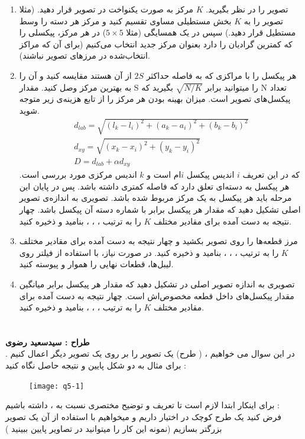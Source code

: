 \documentclass[a4paper]{article}
\begin{document}
\begin{enumerate}
	\item 
	تصویر 
	را در نظر بگیرید. 
$ K $
مرکز به صورت  یکنواخت در تصویر قرار دهید. (مثلا تصویر را به $ K $ بخش مستطیلی مساوی تقسیم کنید و مرکز هر دسته را وسط مستطیل قرار دهید.)  سپس در یک همسایگی (مثلا $ 5 \times 5 $) در هر مرکز، پیکسلی را که کمترین گرادیان را دارد بعنوان مرکز جدید انتخاب می‌کنیم (برای آن که مراکز انتخاب‌شده در مرزهای تصویر نباشند). 
\item
هر پیکسل را با مراکزی که به فاصله حداکثر 
$ 2S $ 
از آن هستند مقایسه کنید و آن‌ را به بهترین مرکز وصل کنید. مقدار S را میتوانید برابر 
$ \sqrt{N/K} $
بگیرید که N تعداد پیکسل‌های تصویر است. میزان بهینه بودن هر مرکز را از تابع هزینه‌ی زیر متوجه شوید. 
\begin{gather*}
	d_{lab} = \sqrt{(l_{k} -l_{i})^{2} +(a_{k} - a_{i})^{2} +(b_{k} -b_{i})^{2}}
	\\
	d_{xy} = \sqrt{(x_{k} - x_{i})^{2} +(y_{k} - y_{i})^{2}}
	\\
	D = d_{lab} +\alpha d_{xy}
\end{gather*}
که در این تعریف $ i $ اندیس پیکسل‌ $ i $ام است و $ k $ اندیس مرکزی مورد بررسی است. هر پیکسل به دسته‌ای تعلق دارد که فاصله کمتری داشته باشد. پس در پایان این مرحله باید هر پیکسل به یک مرکز مربوط شده باشد. تصویری به اندازه‌ی تصویر اصلی تشکیل دهید که مقدار هر پیکسل برابر با شماره دسته آن پیکسل باشد. چهار نتیجه به دست
آمده برای مقادیر مختلف $ K $
 را به ترتیب
،
،
،
بنامید و ذخیره کنید. 
\item
مرز قطعه‌ها را روی تصویر بکشید و چهار نتیجه به دست آمده برای مقادیر مختلف $ K $  را به ترتیب
،
،
،
بنامید و ذخیره کنید. در صورت نیاز، با استفاده از فیلتر 
روی لیبل‌ها، قطعات نهایی را هموار و پیوسته کنید.
\item
تصویری به اندازه تصویر اصلی در تشکیل دهید که مقدار هر پیکسل برابر میانگین مقدار پیکسل‌های داخل قطعه‌ مخصوص‌اش است. چهار نتیجه به دست آمده برای مقادیر مختلف $ K $  را به ترتیب
،
،
،
بنامید و ذخیره کنید.
\end{enumerate}

\section{}
\textbf{طراح :‌ سیدسعید رضوی}
\vspace{0.5cm}
\\
در این سوال می خواهیم
، 
( طرح) یک تصویر را بر روی  یک تصویر دیگر اعمال کنیم . برای مثال به دو شکل پایین و نتیجه حاصل نگاه کنید : 
\begin{figure}[H]
	\centering
	\texttt{[image: q5-1]}
	\caption{}
	\label{6}
\end{figure}
برای اینکار ابتدا لازم است تا تعریف و توضیح مختصری نسبت به 
، 
داشته باشیم : 
\\
فرض کنید یک طرح کوچک در اختیار داریم و میخواهیم با استفاده از آن یک تصویر بزرگتر بسازیم (نمونه این کار را میتوانید در تصاویر پایین ببینید ) 
\end{document}
